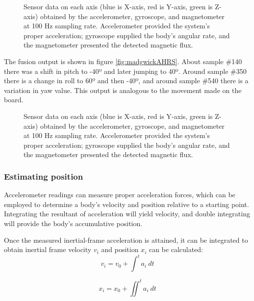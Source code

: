 \begin{figure}[!h]
    \centering
    \resizebox{1\linewidth}{!}{}
    \caption{Sensor data on each axis (blue is X-axis, red is Y-axis, green is Z-axis) obtained by the accelerometer, gyroscope, and magnetometer at 100 Hz sampling rate. Accelerometer provided the system's proper acceleration; gyroscope supplied the body's angular rate, and the magnetometer presented the detected magnetic flux.}
\end{figure}

The fusion output is shown in figure \ref{fig:madgwickAHRS}. About sample \#140 there was a shift in pitch to -40º and later jumping to 40º. Around sample \#350 there is a change in roll to 60º and then -40º, and around sample \#540 there is a variation in yaw value. This output is analogous to the movement made on the board.

\begin{figure}
    \centering
    \resizebox{1\linewidth}{!}{}
    \caption{Sensor data on each axis (blue is X-axis, red is Y-axis, green is Z-axis) obtained by the accelerometer, gyroscope, and magnetometer at 100 Hz sampling rate. Accelerometer provided the system's proper acceleration; gyroscope supplied the body's angular rate, and the magnetometer presented the detected magnetic flux.}
\end{figure}

\subsubsection{Estimating position}
Accelerometer readings can measure proper acceleration forces, which can be employed to determine a body's velocity and position relative to a starting point. Integrating the resultant of acceleration will yield velocity, and double integrating will provide the body's accumulative position.

Once the measured inertial-frame acceleration is attained, it can be integrated to obtain inertial frame velocity $v_i$  and position $x_i$ can be calculated:
\begin{equation}
    v_i = v_0 +  \int^t a_i~dt
\end{equation}

\begin{equation}
    x_i = x_0 + \iint^t a_i~dt
\end{equation}

